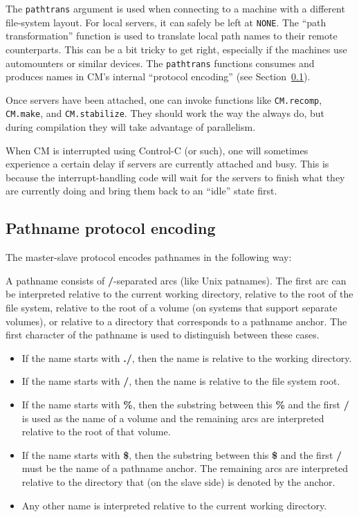 \documentclass{article}
\begin{document}
The {\tt pathtrans} argument is used when connecting to a machine with
a different file-system layout.  For local servers, it can safely be
left at {\tt NONE}.  The ``path transformation'' function is used to
translate local path names to their remote counterparts.  This can be
a bit tricky to get right, especially if the machines use automounters
or similar devices.  The {\tt pathtrans} functions consumes and
produces names in CM's internal ``protocol encoding'' (see
Section~\ref{sec:pathencode}).

Once servers have been attached, one can invoke functions like
{\tt CM.recomp}, {\tt CM.make}, and {\tt CM.stabilize}.  They should
work the way the always do, but during compilation they will take
advantage of parallelism.

When CM is interrupted using Control-C (or such), one will sometimes
experience a certain delay if servers are currently attached and busy.
This is because the interrupt-handling code will wait for the servers
to finish what they are currently doing and bring them back to an
``idle'' state first.

\subsection{Pathname protocol encoding}
\label{sec:pathencode}

The master-slave protocol encodes pathnames in the following way:

A pathname consists of {\bf /}-separated arcs (like Unix patnames).
The first arc can be interpreted relative to the current working directory,
relative to the root of the file system, relative to the root of a
volume (on systems that support separate volumes), or relative to a
directory that corresponds to a pathname anchor.  The first character
of the pathname is used to distinguish between these cases.

\begin{itemize}
\item If the name starts with {\bf ./}, then the name is relative to
the working directory.
\item If the name starts with {\bf /}, then the name is relative to
the file system root.
\item If the name starts with {\bf \%}, then the substring between this
{\bf \%} and the first {\bf /} is used as the name of a volume and the
remaining arcs are interpreted relative to the root of that volume.
\item If the name starts with {\bf \$}, then the substring between
this {\bf \$} and the first {\bf /} must be the name of a pathname
anchor.  The remaining arcs are interpreted relative to the directory
that (on the slave side) is denoted by the anchor.
\item Any other name is interpreted relative to the current working
directory.
\end{itemize}
\end{document}
